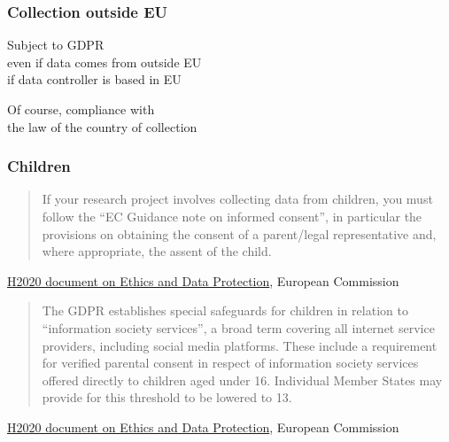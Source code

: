 \documentclass[17pt,aspectratio=169,hyperref={pdfusetitle,colorlinks,allcolors=olive}]{beamer}
\begin{document}
\begin{frame}[fragile]
  \frametitle{Collection outside EU}

  Subject to GDPR \\
  even if data comes from outside EU \\
  if data controller is based in EU \\

  \vspace{1cm}
  
  Of course, compliance with \\
  the law of the country of collection \\
\end{frame}


\begin{frame}[fragile]
\frametitle{Children}

{\small
    \begin{quote}
  If your research project involves collecting data from children, you must follow the ``EC Guidance note on informed consent'', in  particular the provisions on obtaining  the  consent  of  a  parent/legal representative  and,  where  appropriate,  the  assent  of  the  child.
    \end{quote}

  \begin{flushright}
    \href{https://ec.europa.eu/research/participants/data/ref/h2020/grants_manual/hi/ethics/h2020_hi_ethics-data-protection_en.pdf}{H2020 document on Ethics and Data Protection}, European Commission
  \end{flushright}

  }
  
\end{frame}

\begin{frame}[fragile]

  {\small
    \begin{quote}
The  GDPR establishes special safeguards for children in relation to ``information  society  services'',  a broad term covering all internet service providers, including social media platforms. These include a requirement for verified parental consent in respect of information society services offered directly to  children aged under 16. Individual Member States may  provide for this threshold to  be lowered to 13.
    \end{quote}

  \begin{flushright}
    \href{https://ec.europa.eu/research/participants/data/ref/h2020/grants_manual/hi/ethics/h2020_hi_ethics-data-protection_en.pdf}{H2020 document on Ethics and Data Protection}, European Commission
  \end{flushright}

  }
  
\end{frame}
\end{document}
